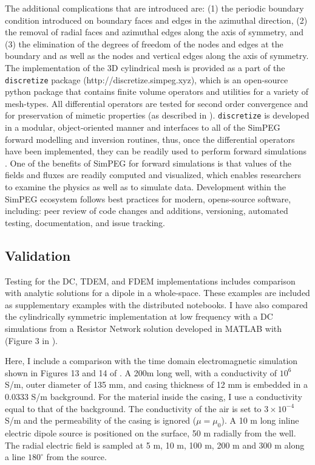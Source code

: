 The additional complications that are introduced are: (1) the periodic boundary condition introduced on boundary faces and edges in the azimuthal direction, (2) the removal of radial faces and azimuthal edges along the axis of symmetry, and (3) the elimination of the degrees of freedom of the nodes and edges at the boundary and as well as the nodes and vertical edges along the axis of symmetry. The implementation of the 3D cylindrical mesh is provided as a part of the \texttt{discretize} package (http://discretize.simpeg.xyz), which is an open-source python package that contains finite volume operators and utilities for a variety of mesh-types. All differential operators are tested for second order convergence and for preservation of mimetic properties (as described in \cite{Haber2014}). \texttt{discretize} is developed in a modular, object-oriented manner and interfaces to all of the SimPEG forward modelling and inversion routines, thus, once the differential operators have been implemented, they can be readily used to perform forward simulations \citep{Cockett2015}.  One of the benefits of SimPEG for forward simulations is that values of the fields and fluxes are readily computed and visualized, which enables researchers to examine the physics as well as to simulate data. Development within the SimPEG ecosystem follows best practices for modern, opens-source software, including: peer review of code changes and additions, versioning, automated testing, documentation, and issue tracking.

\subsection{Validation}
Testing for the DC, TDEM, and FDEM implementations includes comparison with analytic solutions for a dipole in a whole-space. These examples are included as supplementary examples with the distributed notebooks. I have also compared the cylindrically symmetric implementation at low frequency with a DC simulations from a Resistor Network solution developed in MATLAB with (Figure 3 in \cite{Yang2016}).

Here, I include a comparison with the time domain electromagnetic simulation shown in Figures 13 and 14 of \cite{Commer2015}. A 200m long well, with a conductivity of $10^{6}$ S/m, outer diameter of 135 mm, and casing thickness of 12 mm is embedded in a 0.0333 S/m background. For the material inside the casing, I use a conductivity equal to that of the background. The conductivity of the air is set to $3 \times 10^{-4}$ S/m and the permeability of the casing is ignored ($\mu = \mu_0$). A 10 m long inline electric dipole source is positioned on the surface, 50 m radially from the well. The radial electric field is sampled at 5 m, 10 m, 100 m, 200 m and 300 m along a line $180^{\circ}$ from the source.


